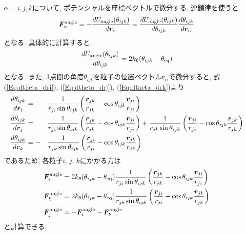 $\alpha = i, j, k$について, ポテンシャルを座標ベクトルで微分する. 連鎖律を使うと
\begin{align}
   \bm{F}_{\alpha}^{\mathrm{angle}}
   =
   -
   \frac{d U_{\mathrm{angle}}(\theta_{ijk})}{d \bm{r}_{\alpha}}
   =
   \frac{d U_{\mathrm{angle}}(\theta_{ijk})}{d \theta_{ijk}}
   \frac{d \theta_{ijk}}{d \bm{r}_{\alpha}}
   \notag
\end{align}
となる. 具体的に計算すると,
\begin{align}
   \frac{d U_{\mathrm{angle}}(\theta_{ijk})}{d \theta_{ijk}}
   =
   2 k_{\theta} (\theta_{ijk} - \theta_{\mathrm{eq}})
   \notag
\end{align}
となる. また, 3点間の角度$\theta_{ijk}$を粒子の位置ベクトル$\bm{r}_{\alpha}$で微分すると, 式(\ref{Eq:dtheta_dri}), (\ref{Eq:dtheta_drj}), (\ref{Eq:dtheta_drk})より
\begin{alignat}{3}
   \frac{d \theta_{ijk}}{d \bm{r}_{i}}
   &=
   -&&
   \frac{1}{r_{ji} \sin\theta_{ijk}}
   \left(
            \frac{\bm{r}_{jk}}{r_{jk}}
          - \cos\theta_{ijk} \frac{\bm{r}_{ji}}{r_{ji}}
   \right)
   \notag
   \\
   \frac{d \theta_{ijk}}{d \bm{r}_{j}}
   &=&&
   \frac{1}{r_{ji} \sin\theta_{ijk}}
   \left(
            \frac{\bm{r}_{jk}}{r_{jk}}
          - \cos\theta_{ijk} \frac{\bm{r}_{ji}}{r_{ji}}
   \right)
   +
   \frac{1}{r_{jk} \sin\theta_{ijk}}
   \left(
            \frac{\bm{r}_{ji}}{r_{ji}}
          - \cos\theta_{ijk} \frac{\bm{r}_{jk}}{r_{jk}}
   \right)
   \notag
   \\
   \frac{d \theta_{ijk}}{d \bm{r}_{k}}
   &=
   -&&
   \frac{1}{r_{jk} \sin\theta_{ijk}}
   \left(
           \frac{\bm{r}_{ji}}{r_{ji}}
         - \cos\theta_{ijk} \frac{\bm{r}_{jk}}{r_{jk}}
   \right)
   \notag
\end{alignat}
であるため, 各粒子$i$, $j$, $k$にかかる力は
\begin{align}
   \bm{F}_{i}^{\mathrm{angle}}
   &=
   2 k_{\theta} (\theta_{ijk} - \theta_{\mathrm{eq}})
   \frac{1}{r_{ji} \sin\theta_{ijk}}
   \left(
            \frac{\bm{r}_{jk}}{r_{jk}}
          - \cos\theta_{ijk} \frac{\bm{r}_{ji}}{r_{ji}}
   \right)
   \notag \\
   \bm{F}_{k}^{\mathrm{angle}}
   &=
   2 k_{\theta} (\theta_{ijk} - \theta_{\mathrm{eq}})
   \frac{1}{r_{jk} \sin\theta_{ijk}}
   \left(
           \frac{\bm{r}_{ji}}{r_{ji}}
         - \cos\theta_{ijk} \frac{\bm{r}_{jk}}{r_{jk}}
   \right)
   \notag \\
   \bm{F}_{j}^{\mathrm{angle}}
   &=
   - \bm{F}_{i}^{\mathrm{angle}} - \bm{F}_{k}^{\mathrm{angle}}
   \notag
\end{align}
と計算できる.

